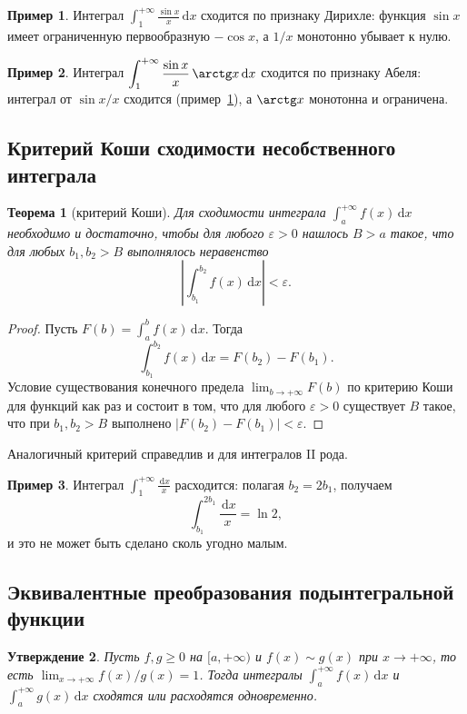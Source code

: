 \documentclass[12pt,a4paper]{article}
\newtheorem{theorem}{Теорема}[section]
\newtheorem{proposition}[theorem]{Утверждение}
\theoremstyle{definition}
\newtheorem{example}{Пример}[section]
\newcommand{\dd}{\,\mathrm{d}}
\newcommand{\eps}{\varepsilon}
\begin{document}
\begin{example}\label{ex:sinx_x}
Интеграл $\displaystyle\int_1^{+\infty}\frac{\sin x}{x}\dd x$ сходится по признаку Дирихле: функция $\sin x$ имеет ограниченную первообразную $-\cos x$, а $1/x$ монотонно убывает к нулю.
\end{example}

\begin{example}
Интеграл $\displaystyle\int_1^{+\infty}\frac{\sin x}{x}\,\arctg x\dd x$ сходится по признаку Абеля: интеграл от $\sin x/x$ сходится (пример~\ref{ex:sinx_x}), а $\arctg x$ монотонна и ограничена.
\end{example}

\subsection{Критерий Коши сходимости несобственного интеграла}\label{sec:Cauchy}

\begin{theorem}[критерий Коши]\label{th:Cauchy}
Для сходимости интеграла $\int_a^{+\infty}f(x)\dd x$ необходимо и достаточно, чтобы для любого $\eps>0$ нашлось $B>a$ такое, что для любых $b_1,b_2>B$ выполнялось неравенство
\[
\left|\int_{b_1}^{b_2}f(x)\dd x\right|<\eps.
\]
\end{theorem}

\begin{proof}
Пусть $F(b)=\int_a^b f(x)\dd x$. Тогда
\[
\int_{b_1}^{b_2}f(x)\dd x = F(b_2)-F(b_1).
\]
Условие существования конечного предела $\lim_{b\to+\infty}F(b)$ по критерию Коши для функций как раз и состоит в том, что для любого $\eps>0$ существует $B$ такое, что при $b_1,b_2>B$ выполнено $|F(b_2)-F(b_1)|<\eps$.
\end{proof}

Аналогичный критерий справедлив и для интегралов II рода.

\begin{example}
Интеграл $\int_1^{+\infty}\frac{\dd x}{x}$ расходится: полагая $b_2=2b_1$, получаем
\[
\int_{b_1}^{2b_1}\frac{\dd x}{x}=\ln 2,
\]
и это не может быть сделано сколь угодно малым.
\end{example}

\subsection{Эквивалентные преобразования подынтегральной функции}

\begin{proposition}\label{prop:equiv}
Пусть $f,g\ge 0$ на $[a,+\infty)$ и $f(x)\sim g(x)$ при $x\to+\infty$, то есть $\lim_{x\to+\infty}f(x)/g(x)=1$. Тогда интегралы $\int_a^{+\infty}f(x)\dd x$ и $\int_a^{+\infty}g(x)\dd x$ сходятся или расходятся одновременно.
\end{proposition}
\end{document}
